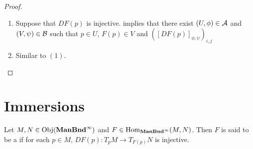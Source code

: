 \documentclass{book}
\begin{document}
	\begin{proof}\
		\begin{enumerate}
			\item Suppose that $DF(p)$ is injective.  implies that there exist $(U, \phi) \in \mathcal{A}$ and $(V, \psi) \in \mathcal{B}$ such that $p \in U$, $F(p) \in V$ and $([DF(p)]_{\phi, \psi})_{i,j}$
			\item Similar to $(1)$. 
		\end{enumerate}
	\end{proof}





































































	
	
	
	
	
	
	
	
	
	
	
	
	\newpage
	\section{Immersions}
	
	\begin{defn} 
		Let $M, N \in \operatorname{Obj}(\operatorname*{\text{\textbf{ManBnd}}^{\infty}})$ and $F \in \operatorname{Hom}_{\operatorname*{\text{\textbf{ManBnd}}^{\infty}}}(M, N)$. Then $F$ is said to be a  if for each $p \in M$, $DF(p):T_pM\rightarrow T_{F(p)}N$ is injective.
	\end{defn}
	
\end{document}
